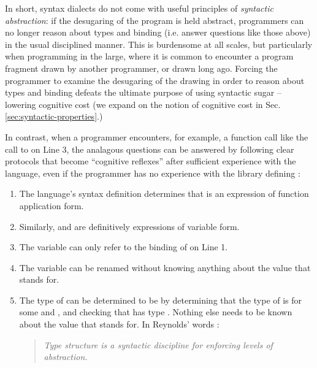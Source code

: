In short, syntax dialects do not come with useful principles of \emph{syntactic abstraction}: if the desugaring of the program is held abstract, programmers can no longer reason about types and binding (i.e. answer questions like those above) in the usual disciplined manner. This is burdensome at all scales, but particularly when programming in the large, where it is common to encounter a program fragment drawn by another programmer, or drawn  long ago. Forcing the programmer to examine the desugaring of the drawing in order to reason about types and binding defeats the ultimate purpose of using syntactic sugar -- lowering cognitive cost (we expand on the notion of cognitive cost in Sec. \ref{sec:syntactic-properties}.) 



In contrast, when a programmer encounters, for example, a function call like the call to  on Line 3, the analagous questions can be answered by following clear protocols that become ``cognitive reflexes'' after sufficient experience with the language, even if the programmer has no experience with the library defining :
\begin{enumerate}
\item The language's syntax definition determines that  is an expression of function application form.
\item Similarly,  and  are definitively expressions of variable form.
\item The variable  can only refer to the binding of  on Line 1.
\item The variable  can be renamed without knowing anything about the value that  stands for.
\item The type of  can be determined to be  by determining that the type of  is  for some  and , and checking that  has type . Nothing else needs to be known about the value that  stands for. In Reynolds' words \cite{B304}:
\begin{quote}
\emph{Type structure is a syntactic discipline for enforcing levels of abstraction.}
\end{quote}
\end{enumerate}



